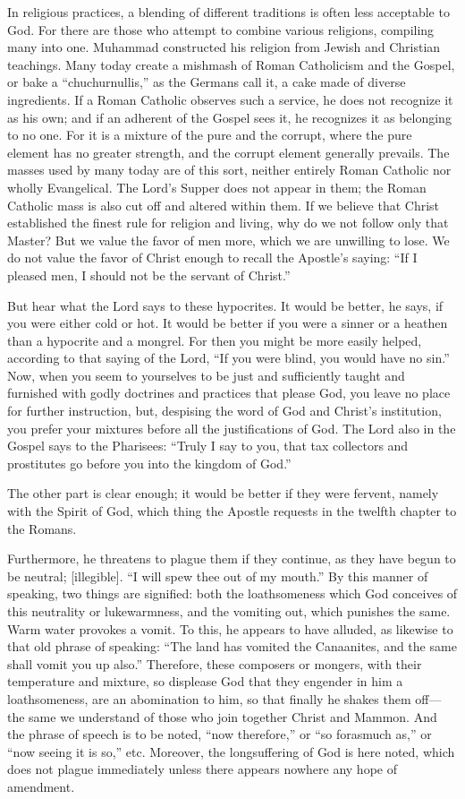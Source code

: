 In religious practices, a blending of different traditions is often less acceptable to God. For there are those who attempt to combine various religions, compiling many into one. Muhammad constructed his religion from Jewish and Christian teachings. Many today create a mishmash of Roman Catholicism and the Gospel, or bake a “chuchurnullis,” as the Germans call it, a cake made of diverse ingredients. If a Roman Catholic observes such a service, he does not recognize it as his own; and if an adherent of the Gospel sees it, he recognizes it as belonging to no one. For it is a mixture of the pure and the corrupt, where the pure element has no greater strength, and the corrupt element generally prevails. The masses used by many today are of this sort, neither entirely Roman Catholic nor wholly Evangelical. The Lord’s Supper does not appear in them; the Roman Catholic mass is also cut off and altered within them. If we believe that Christ established the finest rule for religion and living, why do we not follow only that Master? But we value the favor of men more, which we are unwilling to lose. We do not value the favor of Christ enough to recall the Apostle’s saying: “If I pleased men, I should not be the servant of Christ.”

But hear what the Lord says to these hypocrites. It would be better, he says, if you were either cold or hot. It would be better if you were a sinner or a heathen than a hypocrite and a mongrel. For then you might be more easily helped, according to that saying of the Lord, “If you were blind, you would have no sin.” Now, when you seem to yourselves to be just and sufficiently taught and furnished with godly doctrines and practices that please God, you leave no place for further instruction, but, despising the word of God and Christ’s institution, you prefer your mixtures before all the justifications of God. The Lord also in the Gospel says to the Pharisees: “Truly I say to you, that tax collectors and prostitutes go before you into the kingdom of God.”

The other part is clear enough; it would be better if they were fervent, namely with the Spirit of God, which thing the Apostle requests in the twelfth chapter to the Romans.

Furthermore, he threatens to plague them if they continue, as they have begun to be neutral; [illegible]. “I will spew thee out of my mouth.” By this manner of speaking, two things are signified: both the loathsomeness which God conceives of this neutrality or lukewarmness, and the vomiting out, which punishes the same. Warm water provokes a vomit. To this, he appears to have alluded, as likewise to that old phrase of speaking: “The land has vomited the Canaanites, and the same shall vomit you up also.” Therefore, these composers or mongers, with their temperature and mixture, so displease God that they engender in him a loathsomeness, are an abomination to him, so that finally he shakes them off—the same we understand of those who join together Christ and Mammon. And the phrase of speech is to be noted, “now therefore,” or “so forasmuch as,” or “now seeing it is so,” etc. Moreover, the longsuffering of God is here noted, which does not plague immediately unless there appears nowhere any hope of amendment.

